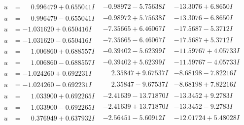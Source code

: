 \documentclass[1p]{elsarticle_modified}
\theoremstyle{definition}
\begin{document}
$$\begin{array}{c|c|c}
\begin{aligned}
u &= \phantom{-}0.996479 + 0.655041 I\end{aligned}
 & -0.98972 - 5.75638 I & -13.3076 + 6.8650 I \\ \hline\begin{aligned}
u &= \phantom{-}0.996479 - 0.655041 I\end{aligned}
 & -0.98972 + 5.75638 I & -13.3076 - 6.8650 I \\ \hline\begin{aligned}
u &= -1.031620 + 0.650416 I\end{aligned}
 & -7.35665 + 6.46067 I & -17.5687 - 5.3712 I \\ \hline\begin{aligned}
u &= -1.031620 - 0.650416 I\end{aligned}
 & -7.35665 - 6.46067 I & -17.5687 + 5.3712 I \\ \hline\begin{aligned}
u &= \phantom{-}1.006860 + 0.688557 I\end{aligned}
 & -0.39402 - 5.62399 I & -11.59767 + 4.05733 I \\ \hline\begin{aligned}
u &= \phantom{-}1.006860 - 0.688557 I\end{aligned}
 & -0.39402 + 5.62399 I & -11.59767 - 4.05733 I \\ \hline\begin{aligned}
u &= -1.024260 + 0.692231 I\end{aligned}
 & \phantom{-}2.35847 + 9.67537 I & -8.68198 - 7.82216 I \\ \hline\begin{aligned}
u &= -1.024260 - 0.692231 I\end{aligned}
 & \phantom{-}2.35847 - 9.67537 I & -8.68198 + 7.82216 I \\ \hline\begin{aligned}
u &= \phantom{-}1.033900 + 0.692265 I\end{aligned}
 & -2.41639 - 13.71870 I & -13.3452 + 9.2783 I \\ \hline\begin{aligned}
u &= \phantom{-}1.033900 - 0.692265 I\end{aligned}
 & -2.41639 + 13.71870 I & -13.3452 - 9.2783 I \\ \hline\begin{aligned}
u &= \phantom{-}0.376949 + 0.637932 I\end{aligned}
 & -2.56451 - 5.60912 I & -12.01724 + 5.48028 I \\ \hline\begin{aligned}

\end{aligned}
\end{array}$$
\end{document}
